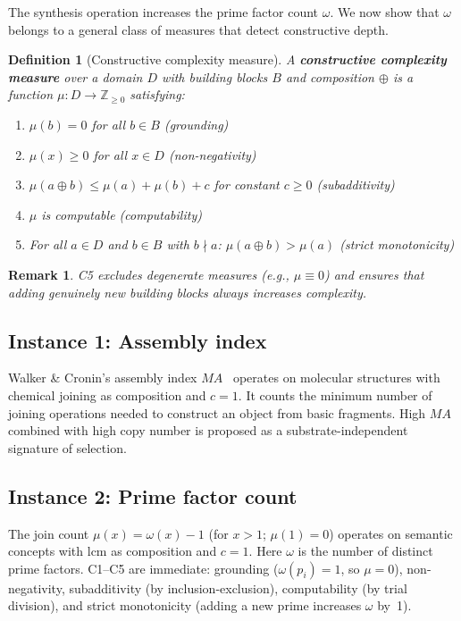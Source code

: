 \documentclass[11pt,a4paper]{article}
\newtheorem{definition}[theorem]{Definition}
\newtheorem{remark}[theorem]{Remark}
\begin{document}
The synthesis operation increases the prime factor count $\omega$.
We now show that $\omega$ belongs to a general class of measures
that detect constructive depth.

\begin{definition}[Constructive complexity measure]
\label{def:ccm}
A \textbf{constructive complexity measure} over a domain $D$ with
building blocks $B$ and composition $\oplus$ is a function
$\mu:D\to\mathbb{Z}_{\geq0}$ satisfying:
\begin{enumerate}[nosep]
\item[(C1)] $\mu(b)=0$ for all $b\in B$ \hfill(grounding)
\item[(C2)] $\mu(x)\geq0$ for all $x\in D$ \hfill(non-negativity)
\item[(C3)] $\mu(a\oplus b)\leq\mu(a)+\mu(b)+c$ for constant
  $c\geq0$ \hfill(subadditivity)
\item[(C4)] $\mu$ is computable \hfill(computability)
\item[(C5)] For all $a\in D$ and $b\in B$ with $b\nmid a$:
  $\mu(a\oplus b)>\mu(a)$ \hfill(strict monotonicity)
\end{enumerate}
\end{definition}

\begin{remark}
C5 excludes degenerate measures (e.g., $\mu\equiv0$) and ensures
that adding genuinely new building blocks always increases
complexity.
\end{remark}

\subsection{Instance 1: Assembly index}

Walker \& Cronin's assembly index $MA$~\citep{sharma2023} operates
on molecular structures with chemical joining as composition and
$c=1$. It counts the minimum number of joining operations needed
to construct an object from basic fragments. High $MA$ combined
with high copy number is proposed as a substrate-independent
signature of selection.

\subsection{Instance 2: Prime factor count}

The join count $\mu(x)=\omega(x)-1$ (for $x>1$; $\mu(1)=0$)
operates on semantic concepts with $\mathrm{lcm}$ as composition
and $c=1$. Here $\omega$ is the number of distinct prime factors.
C1--C5 are immediate: grounding ($\omega(p_i)=1$, so $\mu=0$),
non-negativity, subadditivity (by inclusion-exclusion),
computability (by trial division), and strict monotonicity (adding
a new prime increases $\omega$ by~1).
\end{document}
